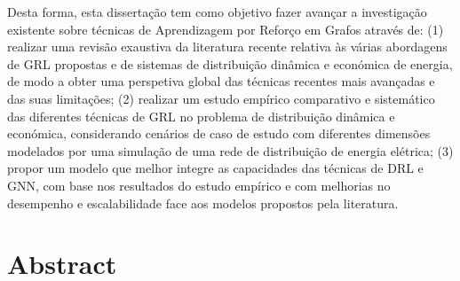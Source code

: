 Desta forma, esta dissertação tem como objetivo fazer avançar a investigação existente sobre técnicas de Aprendizagem por Reforço em Grafos através de: (1) realizar uma revisão exaustiva da literatura recente relativa às várias abordagens de \ac{GRL} propostas e de sistemas de distribuição dinâmica e económica de energia, de modo a obter uma perspetiva global das técnicas recentes mais avançadas e das suas limitações; (2) realizar um estudo empírico comparativo e sistemático das diferentes técnicas de \ac{GRL} no problema de distribuição dinâmica e económica, considerando cenários de caso de estudo com diferentes dimensões modelados por uma simulação de uma rede de distribuição de energia elétrica; (3) propor um modelo que melhor integre as capacidades das técnicas de \acf{DRL} e \acf{GNN}, com base nos resultados do estudo empírico e com melhorias no desempenho e escalabilidade face aos modelos propostos pela literatura. \par



\chapter*{Abstract}


